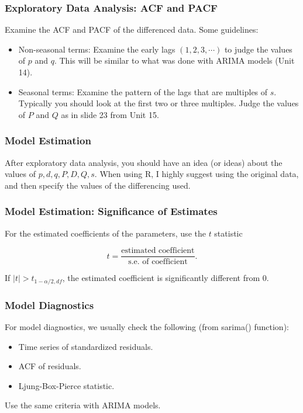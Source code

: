 \documentclass[%
xcolor=pdftex]{beamer}
\begin{document}
\begin{frame}
\frametitle{Exploratory Data Analysis: ACF and PACF}

Examine the ACF and PACF of the differenced data. Some guidelines:

\begin{itemize}
\item Non-seasonal terms: Examine the early lags $(1, 2, 3, \cdots)$ to judge the values of $p$ and $q$. This will be similar to what was done with ARIMA models (Unit 14).
\item Seasonal terms: Examine the pattern of the lags that are multiples of $s$. Typically you should look at the first two or three multiples. Judge the values of $P$ and $Q$ as in slide 23 from Unit 15.
\end{itemize}

\end{frame}

\begin{frame}
\frametitle{Model Estimation}

After exploratory data analysis, you should have an idea (or ideas) about the values of $p, d, q, P, D, Q, s$. When using R, I highly suggest using the original data, and then specify the values of the differencing used.

\end{frame}

\begin{frame}
\frametitle{Model Estimation: Significance of Estimates}

For the estimated coefficients of the parameters, use the $t$ statistic

$$
t = \frac{\mbox{estimated coefficient}}{\mbox{s.e. of coefficient}}.
$$

If $|t| > t_{1 - \alpha/2, df}$, the estimated coefficient is significantly different from 0. 

\end{frame}

\begin{frame}
\frametitle{Model Diagnostics}

For model diagnostics, we usually check the following (from sarima() function):

\begin{itemize}
\item Time series of standardized residuals.
\item ACF of residuals.
\item Ljung-Box-Pierce statistic.
\end{itemize}

Use the same criteria with ARIMA models.

\end{frame}
\end{document}
